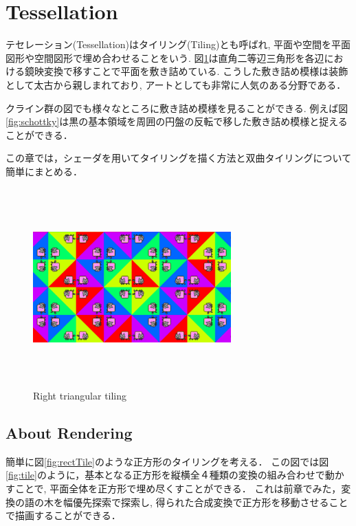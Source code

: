 
\section{Tessellation}

テセレーション(Tessellation)はタイリング(Tiling)とも呼ばれ, 平面や空間を平面図形や空間図形で埋め合わせることをいう. 
図\ref{fig:rightTriangular}は直角二等辺三角形を各辺における鏡映変換で移すことで平面を敷き詰めている. 
こうした敷き詰め模様は装飾として太古から親しまれており, アートとしても非常に人気のある分野である．

クライン群の図でも様々なところに敷き詰め模様を見ることができる. 
例えば図\ref{fig:schottky}は黒の基本領域を周囲の円盤の反転で移した敷き詰め模様と捉えることができる．

この章では，シェーダを用いてタイリングを描く方法と双曲タイリングについて簡単にまとめる．

\begin{figure}[h!tbp]
   \begin{center}
    \includegraphics[width=3in, height=3in, keepaspectratio]{../img/tessellation/rightTriangular.pdf}
    \caption{Right triangular tiling}
    \label{fig:rightTriangular}
   \end{center}
\end{figure}

\subsection{About Rendering}

簡単に図\ref{fig:rectTile}のような正方形のタイリングを考える．
この図では図\ref{fig:tile}のように，基本となる正方形を縦横全４種類の変換の組み合わせで動かすことで, 平面全体を正方形で埋め尽くすことができる．
これは前章でみた，変換の語の木を幅優先探索で探索し, 得られた合成変換で正方形を移動させることで描画することができる．

